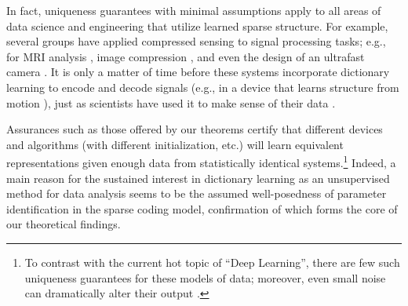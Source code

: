 \documentclass[journal, twocolumn]{IEEEtran}
\begin{document}
In fact, uniqueness guarantees with minimal assumptions apply to all areas of data science and engineering that utilize learned sparse structure. For example, several groups have applied compressed sensing to signal processing tasks; e.g., for MRI analysis \cite{lustig2008compressed}, image compression \cite{Duarte08}, and even the design of an ultrafast camera \cite{Gao14}. It is only a matter of time before these systems incorporate dictionary learning to encode and decode signals (e.g., in a device that learns structure from motion \cite{kong2016prior}), just as scientists have used it to make sense of their data \cite{jung2001imaging, Agarwal14, lee2016sparse, wu2016stability}. 

Assurances such as those offered by our theorems certify that different devices and algorithms (with different initialization, etc.) will learn equivalent representations given enough data from statistically identical systems.\footnote{To contrast with the current hot topic of ``Deep Learning'', there are few such uniqueness guarantees for these models of data; moreover, even small noise can dramatically alter their output \cite{goodfellow2014explaining}.} Indeed, a main reason for the sustained interest in dictionary learning as an unsupervised method for data analysis seems to be the assumed well-posedness of parameter identification in the sparse coding model, confirmation of which forms the core of our theoretical findings.
\end{document}
